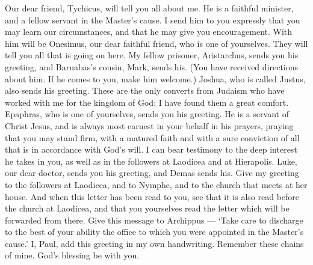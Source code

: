  Our dear friend, Tychicus, will tell you all about me. He
is a faithful minister, and a fellow servant in the Master's cause.
 I send him to you expressly that you may learn our
circumstances, and that he may give you encouragement.  With
him will be Onesimus, our dear faithful friend, who is one of
yourselves. They will tell you all that is going on here. 
My fellow prisoner, Aristarchus, sends you his greeting, and Barnabas's
cousin, Mark, sends his. (You have received directions about him. If he
comes to you, make him welcome.)  Joshua, who is called
Justus, also sends his greeting. These are the only converts from
Judaism who have worked with me for the kingdom of God; I have found
them a great comfort.  Epaphras, who is one of yourselves,
sends you his greeting. He is a servant of Christ Jesus, and is always
most earnest in your behalf in his prayers, praying that you may stand
firm, with a matured faith and with a sure conviction of all that is in
accordance with God's will.  I can bear testimony to the
deep interest he takes in you, as well as in the followers at Laodicea
and at Hierapolis.  Luke, our dear doctor, sends you his
greeting, and Demas sends his.  Give my greeting to the
followers at Laodicea, and to Nymphe, and to the church that meets at
her house.  And when this letter has been read to you, see
that it is also read before the church at Laodicea, and that you
yourselves read the letter which will be forwarded from there.
 Give this message to Archippus --- `Take care to discharge
to the best of your ability the office to which you were appointed in
the Master's cause.'  I, Paul, add this greeting in my own
handwriting. Remember these chains of mine. God's blessing be with you.
